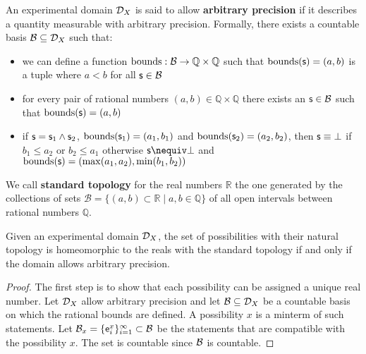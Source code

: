 \documentclass[11pt,letterpaper,fleqn]{memoir} %
\begin{document}
\begin{mathSection}
	
	\begin{defn}
		An experimental domain $\edomain_X$ is said to allow \textbf{arbitrary precision} if it describes a quantity measurable with arbitrary precision. Formally, there exists a countable basis $\basis \subseteq \edomain_X$ such that:
		\begin{itemize}
			\item we can define a function $\operatorname{bounds} : \basis \to \mathbb{Q} \times \mathbb{Q}$ such that $\operatorname{bounds}(\stmt) = (a, b)$ is a tuple where $a < b$ for all $\stmt \in \basis$
			\item for every pair of rational numbers $(a, b) \in \mathbb{Q} \times \mathbb{Q}$ there exists an $\obs \in \basis$ such that $\operatorname{bounds}(\stmt) = (a, b)$
			\item if $\stmt = \stmt_1 \AND \stmt_2$, $\operatorname{bounds}(\stmt_1) = (a_1, b_1)$ and $\operatorname{bounds}(\stmt_2) = (a_2, b_2)$, then $\stmt \equiv \contradiction$ if $b_1 \leq a_2$ or $b_2 \leq a_1$ otherwise $\stmt \nequiv \contradiction$ and $\operatorname{bounds}(\stmt) = (\max(a_1, a_2), \min(b_1, b_2))$
		\end{itemize}
	\end{defn}
	
	\begin{defn}
		We call \textbf{standard topology} for the real numbers $\mathbb{R}$ the one generated by the collections of sets $\mathcal{B} = \{ (a,b) \subset \mathbb{R} \; | \; a,b \in \mathbb{Q} \}$ of all open intervals between rational numbers $\mathbb{Q}$.
	\end{defn}
	
	\begin{thrm}\label{thrm_arbitrary_precision_is_continuity}
		Given an experimental domain $\edomain_X$, the set of possibilities with their natural topology is homeomorphic to the reals with the standard topology if and only if the domain allows arbitrary precision.
	\end{thrm}
	\begin{proof}
		The first step is to show that each possibility can be assigned a unique real number. Let $\edomain_X$ allow arbitrary precision and let $\basis \subseteq \edomain_X$ be a countable basis on which the rational bounds are defined. A possibility $x$ is a minterm of such statements. Let $\basis_x =\{\obs[e]^x_i\}_{i=1}^{\infty} \subset \basis$ be the statements that are compatible with the possibility $x$. The set is countable since $\basis$ is countable.
		

\end{proof}
\end{mathSection}
\end{document}
